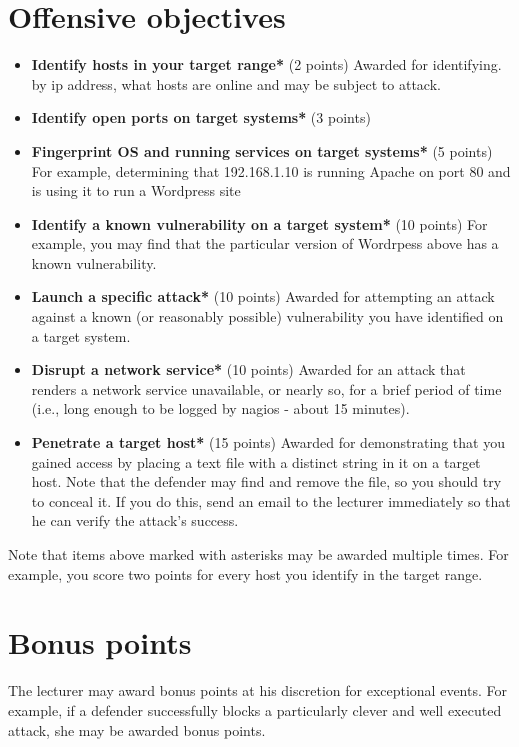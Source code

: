 \documentclass{article}   	%
\begin{document}
\section*{Offensive objectives}
\begin{itemize}
  \item \textbf{Identify hosts in your target range*} (2 points)  Awarded for identifying. by ip address, what hosts are online and may be subject to attack.
  \item \textbf{Identify open ports on target systems*} (3 points)  
  \item \textbf{Fingerprint OS and running services on target systems*} (5 points) For example, determining that 192.168.1.10 is running Apache on port 80 and is using it to run a Wordpress site
  \item \textbf{Identify a known vulnerability on a target system*} (10 points) For example, you may find that the particular version of Wordrpess above has a known vulnerability.
  \item \textbf{Launch a specific attack*} (10 points) Awarded for attempting an attack against a known (or reasonably possible) vulnerability you have identified on a target system.
  \item \textbf{Disrupt a network service*} (10 points) Awarded for an attack that renders a network service unavailable, or nearly so, for a brief period of time (i.e., long enough to be logged by nagios - about 15 minutes).
  \item \textbf{Penetrate a target host*} (15 points) Awarded for demonstrating that you gained access by placing a text file with a distinct string in it on a target host.  Note that the defender may find and remove the file, so you should try to conceal it. If you do this, send an email to the lecturer immediately so that he can verify the attack's success.
  
\end{itemize}

Note that items above marked  with asterisks may be awarded multiple times. For example, you score two points for every host you identify in the target range.

\section*{Bonus points}
The lecturer may award bonus points at his discretion for exceptional events.  For example, if a defender successfully blocks a particularly clever and well executed attack, she may be awarded bonus points.
\end{document}
